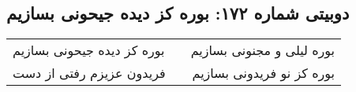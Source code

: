 \begin{center}
\section*{دوبیتی شماره ۱۷۲: بوره کز دیده جیحونی بسازیم}
\label{sec:172}
\begin{longtable}{l p{0.5cm} r}
بوره کز دیده جیحونی بسازیم
&&
بوره لیلی و مجنونی بسازیم
\\
فریدون عزیزم رفتی از دست
&&
بوره کز نو فریدونی بسازیم
\\
\end{longtable}
\end{center}
